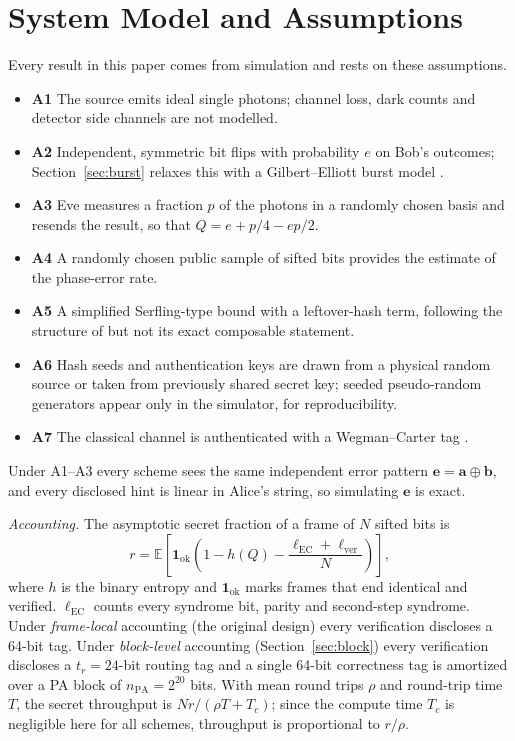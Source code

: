 \documentclass[conference]{IEEEtran}
\begin{document}
\section{System Model and Assumptions}\label{sec:model}
Every result in this paper comes from simulation and rests on these assumptions.
\begin{itemize}
\item \textbf{A1} The source emits ideal single photons; channel loss, dark counts and detector side channels are not modelled.
\item \textbf{A2} Independent, symmetric bit flips with probability $e$ on Bob's outcomes; Section~\ref{sec:burst} relaxes this with a Gilbert--Elliott burst model \cite{gilbert1960,elliott1963}.
\item \textbf{A3} Eve measures a fraction $p$ of the photons in a randomly chosen basis and resends the result, so that $Q=e+p/4-ep/2$.
\item \textbf{A4} A randomly chosen public sample of sifted bits provides the estimate of the phase-error rate.
\item \textbf{A5} A simplified Serfling-type bound \cite{serfling1974} with a leftover-hash term, following the structure of \cite{tomamichel2012} but not its exact composable statement.
\item \textbf{A6} Hash seeds and authentication keys are drawn from a physical random source or taken from previously shared secret key; seeded pseudo-random generators appear only in the simulator, for reproducibility.
\item \textbf{A7} The classical channel is authenticated with a Wegman--Carter tag \cite{wegmancarter1981}.
\end{itemize}
Under A1--A3 every scheme sees the same independent error pattern $\mathbf{e}=\mathbf{a}\oplus\mathbf{b}$, and every disclosed hint is linear in Alice's string, so simulating $\mathbf{e}$ is exact.

\textit{Accounting.} The asymptotic secret fraction of a frame of $N$ sifted bits is
\begin{equation}
r=\mathbb{E}\!\left[\mathbf{1}_{\mathrm{ok}}\left(1-h(Q)-\frac{\ell_{\mathrm{EC}}+\ell_{\mathrm{ver}}}{N}\right)\right],
\label{eq:r}
\end{equation}
where $h$ is the binary entropy and $\mathbf{1}_{\mathrm{ok}}$ marks frames that end identical and verified. $\ell_{\mathrm{EC}}$ counts every syndrome bit, parity and second-step syndrome. Under \emph{frame-local} accounting (the original design) every verification discloses a 64-bit tag. Under \emph{block-level} accounting (Section~\ref{sec:block}) every verification discloses a $t_r=24$-bit routing tag and a single 64-bit correctness tag is amortized over a PA block of $n_{\mathrm{PA}}=2^{20}$ bits. With mean round trips $\rho$ and round-trip time $T$, the secret throughput is $Nr/(\rho T+T_c)$; since the compute time $T_c$ is negligible here for all schemes, throughput is proportional to $r/\rho$.
\end{document}
